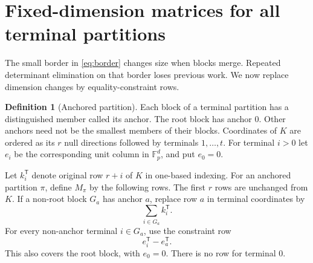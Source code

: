 \documentclass[11pt,letterpaper]{article}
\theoremstyle{definition}\newtheorem{definition}[theorem]{Definition}
\theoremstyle{remark}\newtheorem{remark}[theorem]{Remark}
\newcommand{\F}{\mathbb F}
\newcommand{\trans}{^{\mathsf T}}
\begin{document}
\section{Fixed-dimension matrices for all terminal partitions}
\label{sec:fixed}

The small border in \eqref{eq:border} changes size when blocks merge. Repeated determinant elimination on that border loses previous work. We now replace dimension changes by equality-constraint rows.

\begin{definition}[Anchored partition]
Each block of a terminal partition has a distinguished member called its anchor. The root block has anchor $0$. Other anchors need not be the smallest members of their blocks. Coordinates of $K$ are ordered as its $r$ null directions followed by terminals $1,\ldots,t$. For terminal $i>0$ let $e_i$ be the corresponding unit column in $\F_p^d$, and put $e_0=0$.
\end{definition}

Let $k_i\trans$ denote original row $r+i$ of $K$ in one-based indexing. For an anchored partition $\pi$, define $M_\pi$ by the following rows. The first $r$ rows are unchanged from $K$. If a non-root block $G_a$ has anchor $a$, replace row $a$ in terminal coordinates by
\[
 \sum_{i\in G_a}k_i\trans.
\]
For every non-anchor terminal $i\in G_a$, use the constraint row
\[
 e_i\trans-e_a\trans.
\]
This also covers the root block, with $e_0=0$. There is no row for terminal $0$.
\end{document}
